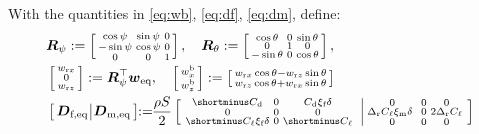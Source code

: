 \begin{algorithm}
\begin{algorithmic}[1]
        
\State With the quantities in \eqref{eq:wb}, \eqref{eq:df}, \eqref{eq:dm}, define:
\begin{align*}
    & \boldsymbol{R}_\psi := \smallmat{ \cos \psi & \sin \psi & 0 \\ -\sin \psi & \cos \psi & 0 \\ 0 & 0 & 1 },    \quad 
      \boldsymbol{R}_\theta := \smallmat{ \cos \theta & 0 & \sin \theta \\ 0 & 1 & 0 \\ -\sin \theta & 0 & \cos \theta },         \\
     &\smallmat{w_{\text{r}x} \\ 0 \\ w_{\text{r}z}} :=  \boldsymbol{R}_\psi^\top \boldsymbol{w}_{\text{eq}}, \quad
    \smallmat{w^{\text{b}}_{x} \\ w^{\text{b}}_{z}} := \smallmat{w_{\text{r}x} \cos \theta -   w_{\text{r}z} \sin\theta \\ w_{\text{r}z} \cos \theta + w_{\text{r}x} \sin \theta }
     \\
     &\left[ \! \! \begin{array}{c|c} 
     \boldsymbol{D}_{\text{f,eq}} \! \! &  \! \! \boldsymbol{D}_{\text{m,eq}}
     \end{array} \! \!\right] \! \! := \! \! \frac{\rho S}{2} \left[\begin{array}{c|c} \! \! \begin{smallmatrix}
                \shortminus C_{\text{d}} & 0 & C_{\text{d}}\xi_{\text{f}} \delta\\
                0 & 0 & 0\\
                \shortminus C_{\ell}\xi_{\text{f}} \delta & 0 & \shortminus C_{\ell}
            \end{smallmatrix} &  \! \! \begin{smallmatrix}
                0 & 0 & 0\\
               \Delta_{\text{r}}C_{\ell}\xi_{\text{m}}\delta\ & 0 & 2\Delta_{\text{r}}C_{\ell}\\
                0 & 0 & 0
            \end{smallmatrix} \end{array} \! \!\right]
\end{align*}


\end{algorithmic}
\end{algorithm}
